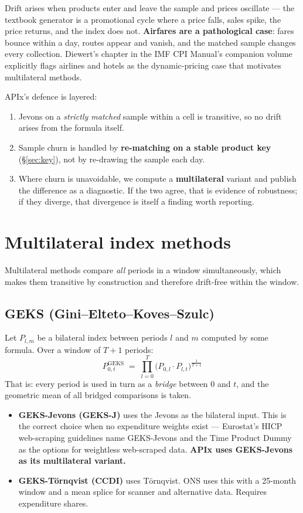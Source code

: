 Drift arises when products enter and leave the sample and prices oscillate --- the textbook
generator is a promotional cycle where a price falls, sales spike, the price returns, and
the index does not. \textbf{Airfares are a pathological case}: fares bounce within a day,
routes appear and vanish, and the matched sample changes every collection. Diewert's
chapter in the IMF CPI Manual's companion volume explicitly flags airlines and hotels as
the dynamic-pricing case that motivates multilateral methods.

APIx's defence is layered:
\begin{enumerate}
\item Jevons on a \emph{strictly matched} sample within a cell is transitive, so no drift
arises from the formula itself.
\item Sample churn is handled by \textbf{re-matching on a stable product key} (\S\ref{sec:key}),
not by re-drawing the sample each day.
\item Where churn is unavoidable, we compute a \textbf{multilateral} variant and publish
the difference as a diagnostic. If the two agree, that is evidence of robustness; if they
diverge, that divergence is itself a finding worth reporting.
\end{enumerate}

\section{Multilateral index methods}

Multilateral methods compare \emph{all} periods in a window simultaneously, which makes them
transitive by construction and therefore drift-free within the window.

\subsection{GEKS (Gini--Elteto--Koves--Szulc)}

Let $P_{l,m}$ be a bilateral index between periods $l$ and $m$ computed by some formula.
Over a window of $T+1$ periods:
\begin{equation}
\boxed{\;P^{\text{GEKS}}_{0,t} \;=\; \prod_{l=0}^{T}\Big(P_{0,l}\cdot P_{l,t}\Big)^{\frac{1}{T+1}}\;}
\end{equation}
That is: every period is used in turn as a \emph{bridge} between $0$ and $t$, and the
geometric mean of all bridged comparisons is taken.

\begin{itemize}
\item \textbf{GEKS-Jevons (GEKS-J)} uses the Jevons as the bilateral input. This is the
correct choice when no expenditure weights exist --- Eurostat's HICP web-scraping guidelines
name GEKS-Jevons and the Time Product Dummy as the options for weightless web-scraped data.
\textbf{APIx uses GEKS-Jevons as its multilateral variant.}
\item \textbf{GEKS-T\"ornqvist (CCDI)} uses T\"ornqvist. ONS uses this with a 25-month
window and a mean splice for scanner and alternative data. Requires expenditure shares.
\end{itemize}

